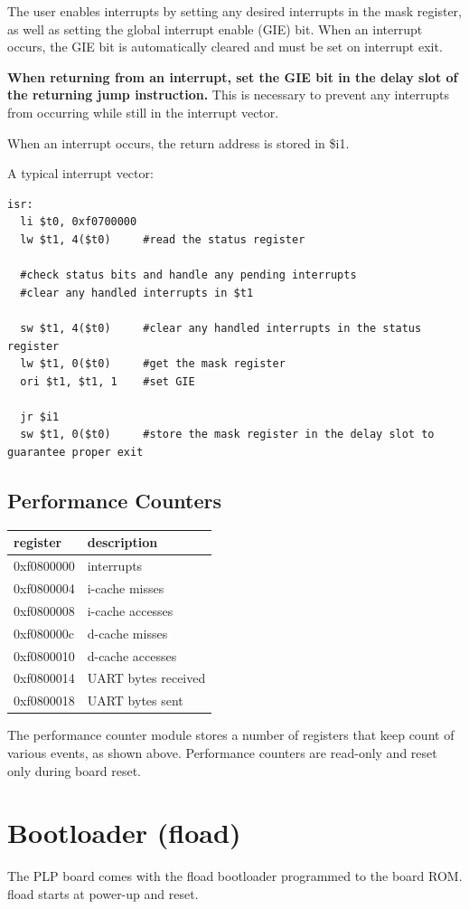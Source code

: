 \documentclass{article}
\begin{document}
The user enables interrupts by setting any desired interrupts in the mask register, as well as setting the global interrupt enable (GIE) bit. When an interrupt occurs, the GIE bit is automatically cleared and must be set on interrupt exit.

\textbf{When returning from an interrupt, set the GIE bit in the delay slot of the returning jump instruction.} This is necessary to prevent any interrupts from occurring while still in the interrupt vector.

When an interrupt occurs, the return address is stored in \$i1.

A typical interrupt vector: 
\begin{verbatim}
isr:
  li $t0, 0xf0700000
  lw $t1, 4($t0)     #read the status register
  
  #check status bits and handle any pending interrupts
  #clear any handled interrupts in $t1

  sw $t1, 4($t0)     #clear any handled interrupts in the status register
  lw $t1, 0($t0)     #get the mask register
  ori $t1, $t1, 1    #set GIE

  jr $i1
  sw $t1, 0($t0)     #store the mask register in the delay slot to guarantee proper exit
\end{verbatim}

\subsection{Performance Counters}
\begin{tabular}{ | l | l | }
\hline
register & description \\
\hline 
0xf0800000 & interrupts \\
0xf0800004 & i-cache misses \\
0xf0800008 & i-cache accesses \\
0xf080000c & d-cache misses \\
0xf0800010 & d-cache accesses \\
0xf0800014 & UART bytes received \\
0xf0800018 & UART bytes sent \\
\hline
\end{tabular}

The performance counter module stores a number of registers that keep count of various events, as shown above. Performance counters are read-only and reset only during board reset. 
\section{Bootloader (fload)}
The PLP board comes with the fload bootloader programmed to the board ROM. fload starts at power-up and reset.
\end{document}
